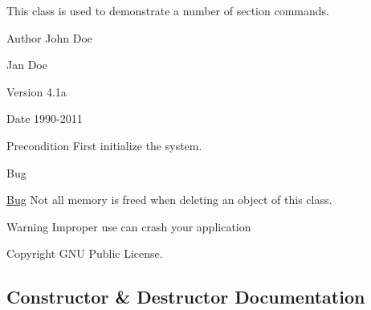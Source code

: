 This class is used to demonstrate a number of section commands. \begin{DoxyAuthor}{Author}
John Doe 

Jan Doe 
\end{DoxyAuthor}
\begin{DoxyVersion}{Version}
4.\+1a 
\end{DoxyVersion}
\begin{DoxyDate}{Date}
1990-\/2011 
\end{DoxyDate}
\begin{DoxyPrecond}{Precondition}
First initialize the system. 
\end{DoxyPrecond}
\begin{DoxyRefDesc}{Bug}
\item[\hyperlink{bug__bug000001}{Bug}]Not all memory is freed when deleting an object of this class. \end{DoxyRefDesc}
\begin{DoxyWarning}{Warning}
Improper use can crash your application 
\end{DoxyWarning}
\begin{DoxyCopyright}{Copyright}
G\+NU Public License. 
\end{DoxyCopyright}


\subsection{Constructor \& Destructor Documentation}
